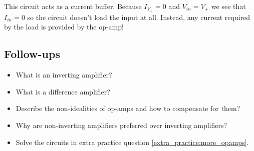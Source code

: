 \documentclass[main.tex]{subfiles}
\begin{document}
\newnoindentpara This circuit acts as a current buffer. Because $I_{V_{+}} = 0$ and $V_{in} = V_{+}$ we see that $I_{in} = 0$ so the circuit doesn't load the input at all. Instead, any current required by the load is provided by the op-amp! 





\subsection{Follow-ups}
\begin{itemize}
    \item What is an inverting amplifier?
    \item What is a difference amplifier?
    \item Describe the non-idealities of op-amps and how to compensate for them? %
    \item Why are non-inverting amplifiers preferred over inverting amplifiers? %
    \item Solve the circuits in extra practice question \ref{extra_practice:more_opamps}. 
\end{itemize}
\end{document}
